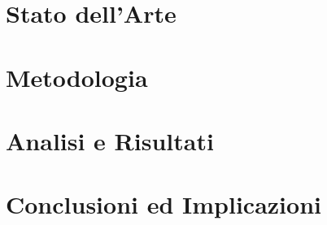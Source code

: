 \documentclass[a4paper,12pt,oneside,top=6cm,bottom=3cm,left=3.5cm,right=3.5cm,openright,reqno,table]{book}
\begin{document}
\chapter{Stato dell'Arte}


\chapter{Metodologia}


\chapter{Analisi e Risultati}

\chapter{Conclusioni ed Implicazioni}


\printbibliography[title={Bibliografia}] 
\newpage

\appendix
\end{document}
